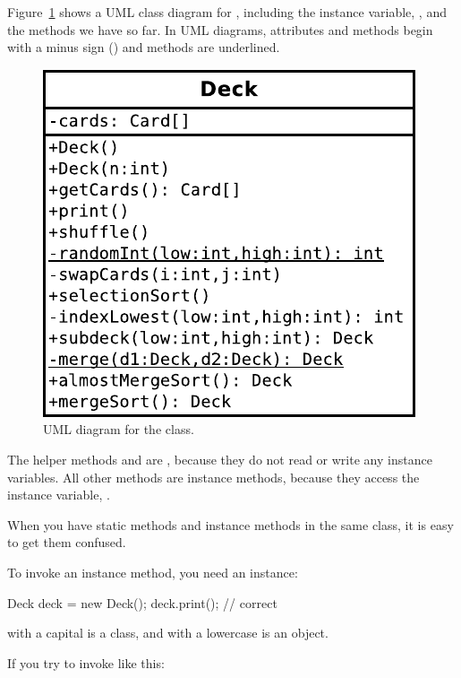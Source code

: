 Figure~\ref{fig.deck} shows a UML class diagram for , including the instance variable, , and the methods we have so far.
In UML diagrams,  attributes and methods begin with a minus sign (\java{-}) and  methods are underlined.


\begin{figure}[!ht]
\begin{center}
\includegraphics{figs/deck.pdf}
\caption{UML diagram for the  class.}
\label{fig.deck}
\end{center}
\end{figure}

The helper methods  and  are , because they do not read or write any instance variables.
All other methods are instance methods, because they access the instance variable, .

When you have static methods and instance methods in the same class, it is easy to get them confused.

To invoke an instance method, you need an instance:

\begin{code}
Deck deck = new Deck();
deck.print();  // correct
\end{code}

 with a capital  is a class, and  with a lowercase  is an object.

If you try to invoke  like this:

